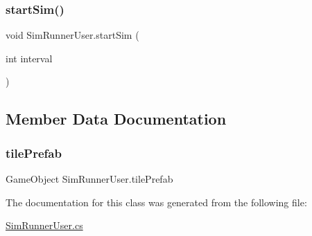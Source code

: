 \subsubsection{\texorpdfstring{start\+Sim()}{startSim()}}
{\footnotesize\ttfamily void Sim\+Runner\+User.\+start\+Sim (\begin{DoxyParamCaption}\item[{int}]{interval }\end{DoxyParamCaption})}



\subsection{Member Data Documentation}
\mbox{\label{class_sim_runner_user_a049fcb968076857e64527f1ed6645284}} 
\subsubsection{\texorpdfstring{tile\+Prefab}{tilePrefab}}
{\footnotesize\ttfamily Game\+Object Sim\+Runner\+User.\+tile\+Prefab}



The documentation for this class was generated from the following file\+:\begin{DoxyCompactItemize}
\item 
\mbox{\hyperlink{_sim_runner_user_8cs}{Sim\+Runner\+User.\+cs}}\end{DoxyCompactItemize}
